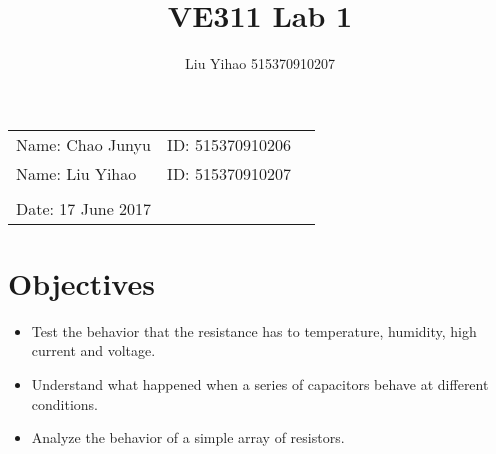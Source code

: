\documentclass{article}
\title{VE311 Lab 1}
\author{Liu Yihao 515370910207}
\date{}
\begin{document}
\vspace*{0.25cm}

\hrulefill

\thispagestyle{empty}

\begin{center}
\begin{large}
\end{large}

\hrulefill

\vspace*{5cm}
\begin{Large}
\end{Large}

\vspace{2em}

\begin{large}
\end{large}
\end{center}

\vfill

\begin{table}[h!]
\flushleft
\begin{tabular}{lll}
Name: Chao Junyu \hspace*{2em}&
ID: 515370910206\hspace*{2em}\\
Name: Liu Yihao \hspace*{2em}&
ID: 515370910207\hspace*{2em}\\
\\

Date: 17 June 2017 

\end{tabular}
\end{table}

\hfill

\newpage

\section{Objectives}
\begin{itemize}
	\item Test the behavior that the resistance has to temperature, humidity, high current and voltage.
	\item Understand what happened when a series of capacitors behave at different conditions.
	\item Analyze the behavior of a simple array of resistors.
\end{itemize}
\end{document}

